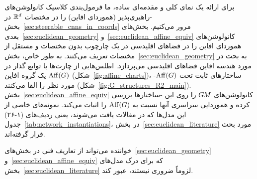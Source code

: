 برای ارائه یک نمای کلی و مقدمه‌ای ساده، ما فرمول‌بندی کلاسیک کانولوشن‌های -راهبری‌پذیر (هموردای افاین) را در مختصات $\mathbb{R}^d$ در بخش~\ref{sec:steerable_cnns_in_coords} مرور می‌کنیم.
بخش‌های بعدی~\ref{sec:euclidean_geometry} و~\ref{sec:euclidean_affine_equiv} کانولوشن‌های هموردای افاین را در فضاهای اقلیدسی در یک چارچوب بدون مختصات و مستقل از مختصات تعریف می‌کنند.
به طور خاص، بخش~\ref{sec:euclidean_geometry} به بحث در مورد هندسه افاین فضاهای اقلیدسی می‌پردازد.
اطلس‌هایی از چارت‌ها با توابع گذار در یک گروه افاین $\operatorname{Aff}(G)$ (شکل~\ref{fig:affine_charts})، -ساختارهای ثابت تحت $\operatorname{Aff}(G)$ مورد نظر را القا می‌کنند (شکل~\ref{fig:G_structures_R2_main}).
بخش~\ref{sec:euclidean_affine_equiv} کانولوشن‌های $G\mkern-1.4muM$ را روی این -ساختارها بررسی کرده و هموردایی سراسری آنها نسبت به $\operatorname{Aff}(G)$ را اثبات می‌کند.
نمونه‌های خاصی از این مدل‌ها که در مقالات یافت می‌شوند، یعنی ردیف‌های (۱-۲۶) جدول~\ref{tab:network_instantiations}، در بخش~\ref{sec:euclidean_literature} مورد بحث قرار گرفته‌اند.

خواننده می‌تواند از تعاریف فنی در بخش‌های~\ref{sec:euclidean_geometry} و~\ref{sec:euclidean_affine_equiv} که برای درک مدل‌های بخش~\ref{sec:euclidean_literature} لزوماً ضروری نیستند، عبور کند.
